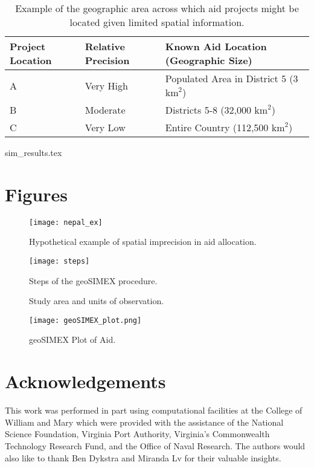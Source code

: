 \newpage
\begin{table}[!htbp]
	\begin{tabular}{| l | l | l |}
	\hline
	Project Location & Relative Precision & Known Aid Location (Geographic Size)\\
    \hline
    A &  Very High & Populated Area in District 5 (3 $\text{km}^2$) \\ \hline
    B &  Moderate & Districts 5-8 (32,000 $\text{km}^2$) \\ \hline
    C &  Very Low & Entire Country (112,500 $\text{km}^2$) \\ \hline
	\end{tabular}
	\caption{Example of the geographic area across which aid projects might be located given limited spatial information.}\label{precision_example}
\end{table}

\newpage
{sim_results.tex}

\newpage


\newpage

\section{Figures}

\begin{figure}[!htbp]
\texttt{[image: nepal\_ex]}
\caption{Hypothetical example of spatial imprecision in aid allocation.}\label{fig:nepalex}
\end{figure}

\begin{figure}[!htbp]
\texttt{[image: steps]}
\caption{Steps of the geoSIMEX procedure.}\label{fig:steps}
\end{figure}

\begin{figure}[!htbp]
\caption{Study area and units of observation.}\label{fig:studyarea}
\end{figure}

\begin{figure}[!htbp]
\texttt{[image: geoSIMEX\_plot.png]}
\caption{geoSIMEX Plot of Aid.}\label{fig:geoSIMEX_plot}
\end{figure}

\newpage

\section{Acknowledgements}
This work was performed in part using computational facilities at the College of William and Mary which were provided with the assistance of the National Science Foundation, Virginia Port Authority, Virginia’s Commonwealth Technology Research Fund, and the Office of Naval Research. 
The authors would also like to thank Ben Dykstra and Miranda Lv for their valuable insights.
\newpage

\printbibliography


